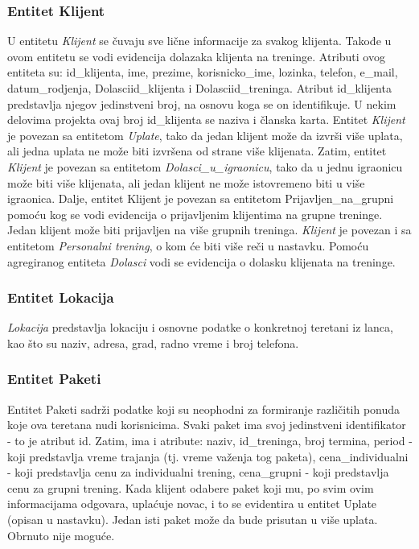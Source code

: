 \documentclass[../main.tex]{subfiles}
\begin{document}
\subsubsection{Entitet Klijent}
U entitetu \textit{Klijent} se čuvaju sve lične informacije za svakog klijenta. Takođe u ovom entitetu se vodi evidencija dolazaka klijenta na treninge. Atributi ovog entiteta su: id\_klijenta, ime, prezime, korisnicko\_ime, lozinka, telefon, e\_mail, datum\_rodjenja, Dolasciid\_klijenta i  Dolasciid\_treninga.
Atribut id\_klijenta predstavlja njegov jedinstveni broj, na osnovu koga se on identifikuje. U nekim delovima projekta ovaj broj id\_klijenta se naziva i članska karta. 
Entitet \textit{Klijent} je povezan sa entitetom \textit{Uplate}, tako da jedan klijent može da izvrši više uplata, ali jedna uplata ne može biti izvršena od strane više klijenata. Zatim, entitet \textit{Klijent} je povezan sa entitetom \textit{Dolasci\_u\_igraonicu}, tako da u jednu igraonicu može biti više klijenata, ali jedan klijent ne može istovremeno biti u više igraonica. %
Dalje, entitet Klijent je povezan sa entitetom Prijavljen\_na\_grupni pomoću kog se vodi evidencija o prijavljenim klijentima na grupne treninge. Jedan klijent može biti prijavljen na više grupnih treninga.
\textit{Klijent} je povezan i sa entitetom \textit{Personalni trening}, o kom će biti više reči u nastavku.
Pomoću agregiranog entiteta \textit{Dolasci} vodi se evidencija o dolasku klijenata na treninge.


\subsubsection{Entitet Lokacija}

\textit{Lokacija} predstavlja lokaciju i osnovne podatke o konkretnoj teretani iz lanca, kao što su naziv, adresa, grad, radno vreme i broj telefona.


\subsubsection{Entitet Paketi}
Entitet Paketi sadrži podatke koji su neophodni za formiranje različitih ponuda koje ova teretana nudi korisnicima. Svaki paket ima svoj jedinstveni identifikator - to je atribut id. Zatim, ima i atribute: naziv, id\_treninga, broj termina, period - koji predstavlja vreme trajanja (tj. vreme važenja tog paketa), cena\_individualni - koji predstavlja cenu za individualni trening, cena\_grupni - koji predstavlja cenu za grupni trening. Kada klijent odabere paket koji mu, po svim ovim informacijama odgovara, uplaćuje novac, i to se evidentira u entitet Uplate (opisan u nastavku). Jedan isti paket može da bude prisutan u više uplata. Obrnuto nije moguće.
\end{document}
